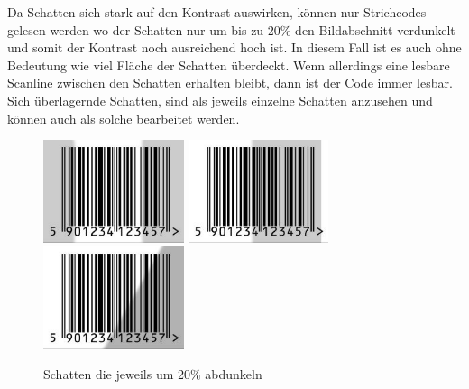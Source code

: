 Da Schatten sich stark auf den Kontrast auswirken, können nur Strichcodes gelesen werden wo der Schatten nur um bis zu 20\% den Bildabschnitt verdunkelt und somit der Kontrast noch ausreichend hoch ist. In diesem Fall ist es auch ohne Bedeutung wie viel Fläche der Schatten überdeckt. Wenn allerdings eine lesbare Scanline zwischen den Schatten erhalten bleibt, dann ist der Code immer lesbar. Sich überlagernde Schatten, sind als jeweils einzelne Schatten anzusehen und können auch als solche bearbeitet werden.
\begin{figure}[H]
  \centering
  \includegraphics[height=3cm]{img/EAN13/shade_01_2x50+50.jpg}
  \includegraphics[height=3cm]{img/EAN13/shade_01_20+50.jpg}
  \includegraphics[height=3cm]{img/EAN13/shade_01_20+s30.jpg}
  \caption{Schatten die jeweils um 20\% abdunkeln}
  \label{fig:eanshade}
\end{figure}
